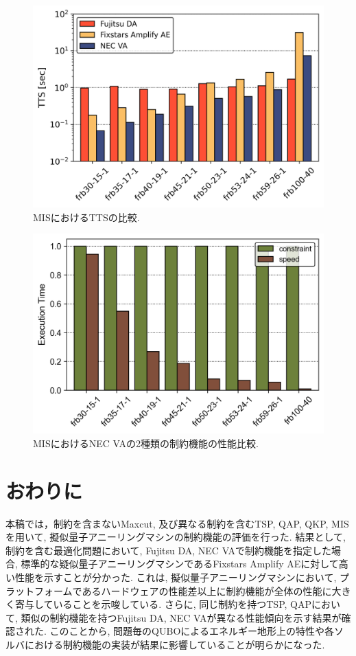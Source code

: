 \documentclass[submit,techrep,noauthor]{ipsj}
\begin{document}
\begin{figure}[hb]
\centering
\includegraphics[bb=0 0 700 280, width=15cm]{TTS_MIS.png}
\caption{MISにおけるTTSの比較.}
\label{MIS_TTS}
\end{figure}

\begin{figure}[hb]
\centering
\includegraphics[bb=0 0 700 250, width=15cm]{speed_vs_constraint_MIS.png}
\caption{MISにおけるNEC VAの2種類の制約機能の性能比較.}
\label{MIS_speed_vs_const}
\end{figure}

\section{おわりに}

本稿では，制約を含まないMaxcut, 及び異なる制約を含むTSP, QAP, QKP, MISを用いて, 擬似量子アニーリングマシンの制約機能の評価を行った. 結果として, 制約を含む最適化問題において, Fujitsu DA, NEC VAで制約機能を指定した場合, 標準的な疑似量子アニーリングマシンであるFixstars Amplify AEに対して高い性能を示すことが分かった. これは, 擬似量子アニーリングマシンにおいて, プラットフォームであるハードウェアの性能差以上に制約機能が全体の性能に大きく寄与していることを示唆している. さらに, 同じ制約を持つTSP, QAPにおいて, 類似の制約機能を持つFujitsu DA, NEC VAが異なる性能傾向を示す結果が確認された. このことから, 問題毎のQUBOによるエネルギー地形上の特性や各ソルバにおける制約機能の実装が結果に影響していることが明らかになった. 
\end{document}
